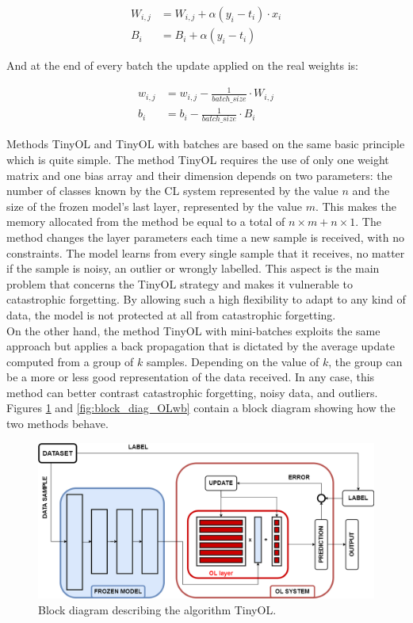 \documentclass[12pt]{report}
\begin{document}
\begin{align}
	W_{i,j} &= W_{i,j} + \alpha (y_i - t_i) \cdot x_i \\
    B_i     &= B_i + \alpha  (y_i - t_i) 
\end{align}

And at the end of every batch the update applied on the real weights is:

\begin{align}
	w_{i,j} &= w_{i,j} - \frac{1}{batch\_size} \cdot W_{i,j} \\
	b_i     &= b_i - \frac{1}{batch\_size} \cdot B_i
\end{align}

Methods TinyOL and TinyOL with batches are based on the same basic principle which is quite simple. The method TinyOL requires the use of only one weight matrix and one bias array and their dimension depends on two parameters: the number of classes known by the CL system represented by the value $n$ and the size of the frozen model's last layer, represented by the value $m$. This makes the memory allocated from the method be equal to a total of $n \times m+n \times 1$. The method changes the layer parameters each time a new sample is received, with no constraints. The model learns from every single sample that it receives, no matter if the sample is noisy, an outlier or wrongly labelled. This aspect is the main problem that concerns the TinyOL strategy and makes it vulnerable to catastrophic forgetting. By allowing such a high flexibility to adapt to any kind of data, the model is not protected at all from catastrophic forgetting.\\
On the other hand, the method TinyOL with mini-batches exploits the same approach but applies a back propagation that is dictated by the average update computed from a group of $k$ samples. Depending on the value of $k$, the group can be a more or less good representation of the data received. In any case, this method can better contrast catastrophic forgetting, noisy data, and outliers. \\
Figures \ref{fig:block_diag_OL} and \ref{fig:block_diag_OLwb} contain a block diagram showing how the two methods behave.

\begin{figure}[h!]
    \centering
    \includegraphics[width=120mm]{Figures/Chapter3/OL.png} 
    \caption{Block diagram describing the algorithm TinyOL.}
    \label{fig:block_diag_OL}    
\end{figure}
\end{document}
